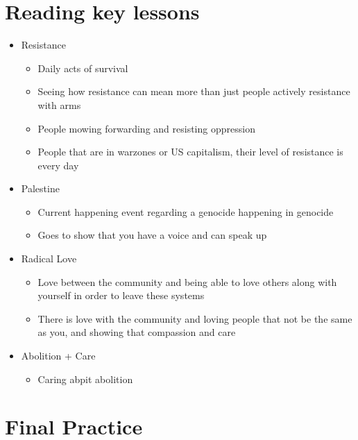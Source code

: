 \documentclass{article}
\begin{document}
\section*{Reading key lessons}
\begin{itemize}
  \item Resistance
    \begin{itemize}
      \item Daily acts of survival
      \item Seeing how resistance can mean more than just
        people actively resistance with arms
      \item People mowing forwarding and resisting oppression
      \item People that are in warzones or US capitalism, their
        level of resistance is every day
    \end{itemize}
  \item Palestine
    \begin{itemize}
      \item Current happening event regarding a genocide happening in genocide
      \item Goes to show that you have a voice and can speak up
    \end{itemize}
  \item Radical Love
    \begin{itemize}
      \item Love between the community and being able to love
        others along with yourself in order to leave these systems
      \item There is love with the community and loving people
        that not be the same as you, and showing that compassion and care
    \end{itemize}
  \item Abolition + Care
    \begin{itemize}
      \item Caring abpit abolition
    \end{itemize}
\end{itemize}

\section*{Final Practice}
\end{document}

